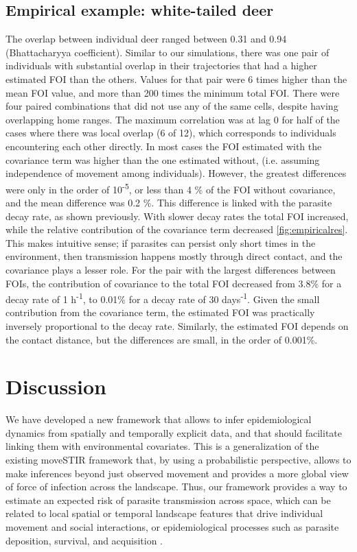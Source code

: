 \documentclass[letterpaper]{article}
\begin{document}
\subsection*{Empirical example: white-tailed deer}
The overlap between individual deer ranged between 0.31 and 0.94 (Bhattacharyya coefficient). 
Similar to our simulations, there was one pair of individuals with substantial overlap in their trajectories that had a higher estimated FOI than the others. Values for that pair were 6 times higher than the mean FOI value, and more than 200 times the minimum total FOI. 
There were four paired combinations that did not use any of the same cells, despite having overlapping home ranges. %
The maximum correlation was at lag 0 for half of the cases where there was local overlap (6 of 12), which corresponds to individuals encountering each other directly.
In most cases the FOI estimated with the covariance term was higher than the one estimated without, (i.e. assuming independence of movement among individuals). However, the greatest differences were only in the order of 10\textsuperscript{-5}, or less than 4 \% of the FOI without covariance, and the mean difference was 0.2 \%.
This difference is linked with the parasite decay rate, as shown previously. With slower decay rates the total FOI increased, while the relative contribution of the covariance term decreased \ref{fig:empiricalres}. 
This makes intuitive sense; if parasites can persist only short times in the environment, then transmission happens mostly through direct contact, and the covariance plays a lesser role. 
For the pair with the largest differences between FOIs, the contribution of covariance to the total FOI decreased from 3.8\% for a decay rate of 1 h\textsuperscript{-1}, to 0.01\% for a decay rate of 30 days\textsuperscript{-1}.
Given the small contribution from the covariance term, the estimated FOI was practically inversely proportional to the decay rate. 
Similarly, the estimated FOI depends on the contact distance, but the differences are small, in the order of 0.001\%. 


\section*{Discussion}
We have developed a new framework that allows to infer epidemiological dynamics from spatially and temporally explicit data, and that should facilitate linking them with environmental covariates. This is a generalization of the existing moveSTIR framework \citep{Wilber2022} that, by using a probabilistic perspective, allows to make inferences beyond just observed movement and provides a more global view of force of infection across the landscape. 
Thus, our framework provides a way to estimate an expected risk of parasite transmission across space, which can be related to local spatial or temporal landscape features that drive individual movement and social interactions, or epidemiological processes such as parasite deposition, survival, and acquisition \citep{Merkle2018,VanderWaal2017}. 
\end{document}
